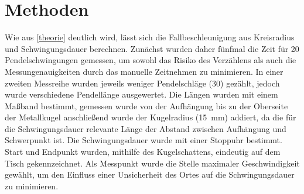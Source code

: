 \section{Methoden}
Wie aus \cref{theorie} deutlich wird, lässt sich die Fallbeschleunigung aus Kreisradius und Schwingungsdauer berechnen. Zunächst wurden daher fünfmal die Zeit für 20 Pendelschwingungen gemessen, um sowohl das Risiko des Verzählens als auch die Messungenauigkeiten durch das manuelle Zeitnehmen zu minimieren. In einer zweiten Messreihe wurden jeweils weniger Pendelschläge (30) gezählt, jedoch wurde verschiedene Pendellänge ausgewertet.
Die Längen wurden mit einem Maßband bestimmt, gemessen wurde von der Aufhängung bis zu der Oberseite der Metallkugel anschließend wurde der Kugelradius (\SI{15}{mm}) addiert, da die für die Schwingungsdauer relevante Länge der Abstand zwischen Aufhängung und Schwerpunkt ist.
Die Schwingungsdauer wurde mit einer Stoppuhr bestimmt. Start und Endpunkt wurden, mithilfe des Kugelschattens, eindeutig auf dem Tisch gekennzeichnet. Als Messpunkt wurde die Stelle maximaler Geschwindigkeit gewählt, um den Einfluss einer Unsicherheit des Ortes auf die Schwingungsdauer zu minimieren. 
